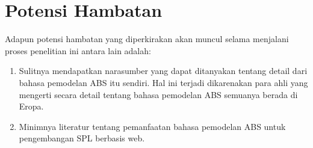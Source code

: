 \section{Potensi Hambatan}

Adapun potensi hambatan yang diperkirakan akan muncul selama menjalani proses penelitian ini antara lain adalah:

\begin{enumerate}
    \item Sulitnya mendapatkan narasumber yang dapat ditanyakan tentang detail dari bahasa pemodelan ABS itu sendiri. Hal ini terjadi dikarenakan para ahli yang mengerti secara detail tentang bahasa pemodelan ABS semuanya berada di Eropa.
    \item Minimnya literatur tentang pemanfaatan bahasa pemodelan ABS untuk pengembangan SPL berbasis web.
\end{enumerate}